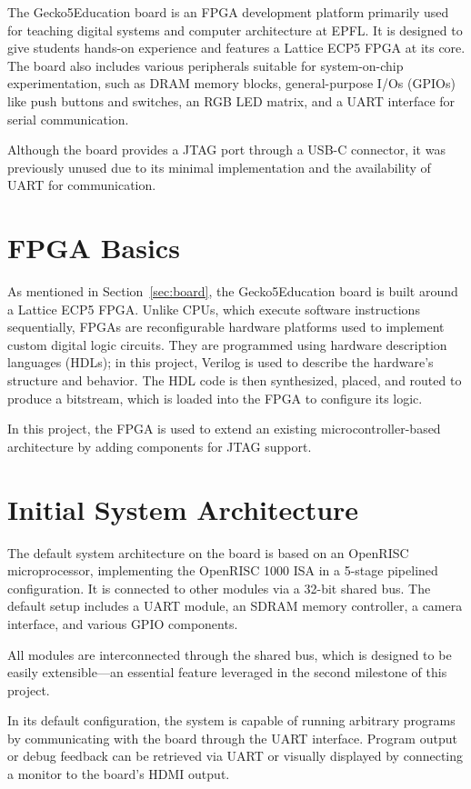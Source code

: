 \documentclass[a4paper,11pt,oneside]{report}
\newcommand{\boardName}{Gecko5Education \xspace}
\begin{document}
The \boardName board is an FPGA development platform primarily  
used for teaching digital systems and computer architecture at EPFL.  
It is designed to give students hands-on experience and features  
a Lattice ECP5 FPGA at its core.  
The board also includes various peripherals suitable for system-on-chip experimentation,  
such as DRAM memory blocks, general-purpose I/Os (GPIOs) like push buttons and switches,  
an RGB LED matrix, and a UART interface for serial communication.  

Although the board provides a JTAG port through a USB-C connector,  
it was previously unused due to its minimal implementation and  
the availability of UART for communication.  

\section{FPGA Basics}

As mentioned in Section~\ref{sec:board}, the \boardName board is built around a Lattice ECP5 FPGA.
Unlike CPUs, which execute software instructions sequentially, FPGAs are reconfigurable hardware platforms used to implement custom digital logic circuits.
They are programmed using hardware description languages (HDLs); in this project, Verilog is used to describe the hardware’s structure and behavior.
The HDL code is then synthesized, placed, and routed to produce a bitstream, which is loaded into the FPGA to configure its logic.

In this project, the FPGA is used to extend an existing microcontroller-based architecture by adding components for JTAG support. 

\section{Initial System Architecture}
\label{sec:arch}

The default system architecture on the board is based on an OpenRISC microprocessor, implementing the OpenRISC 1000 ISA in a 5-stage pipelined configuration.
It is connected to other modules via a 32-bit shared bus.
The default setup includes a UART module, an SDRAM memory controller, a camera interface, and various GPIO components.

All modules are interconnected through the shared bus, which is designed to be easily extensible—an essential feature leveraged in the second milestone of this project.

In its default configuration, the system is capable of running arbitrary programs by communicating with the board through the UART interface.
Program output or debug feedback can be retrieved via UART or visually displayed by connecting a monitor to the board’s HDMI output.
\end{document}

